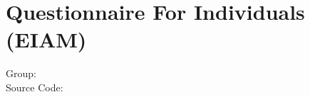 
\chapter{Questionnaire For Individuals (EIAM)} 

\begin{description}
\item [Group:]
\item [Source Code:]
\end{description}



